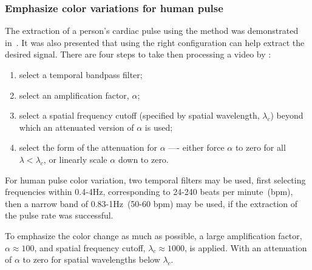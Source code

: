 
\subsubsection{Emphasize color variations for human pulse} \label{sec:sota:evm:color}



The extraction of a person's cardiac pulse using the \evm{} method
was demonstrated in~\cite{Wu2012Eulerian}. It was also presented that
using the right configuration can help extract the desired signal.
There are four steps to take then processing a video by \evm{}:

\begin{enumerate}
  \item select a temporal bandpass filter;
  \item select an amplification factor, $\alpha$;
  \item select a spatial frequency cutoff (specified by spatial wavelength,
        $\lambda_c$) beyond which an attenuated version of $\alpha$ is used;
  \item select the form of the attenuation for $\alpha$ —- either force
        $\alpha$ to zero for all $\lambda < \lambda_c$, or linearly scale
        $\alpha$ down to zero.
\end{enumerate}

For human pulse color variation, two temporal filters may be used, first
selecting frequencies within 0.4-4Hz, corresponding to 24-240 beats per
minute~(bpm), then a narrow band of 0.83-1Hz~(50-60 bpm) may be used,
if the extraction of the pulse rate was successful.

To emphasize the color change as much as possible, a large amplification
factor, $\alpha \approx 100$, and spatial frequency cutoff,
$\lambda_c \approx 1000$, is applied. With an attenuation of $\alpha$ to
zero for spatial wavelengths below $\lambda_c$.

